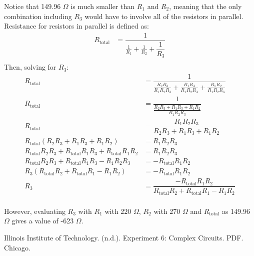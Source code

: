 \documentclass [12pt, letterpaper, twoside] {article}
\begin{document}
Notice that 149.96 \(\Omega\) is much smaller than \(R_{1}\) and \(R_{2}\), meaning that the only combination including \(R_{3}\) would have to involve all of the resistors in parallel. Resistance for resistors in parallel is defined as:
\begin{equation}
  \begin{split}
    R_{\text{total}} &= \dfrac{1}{\tfrac{1}{R_{1}} + \tfrac{1}{R_{2}} + \dfrac{1}{R_{3}}} \\
  \end{split}
\end{equation}
Then, solving for \(R_{3}\):
\begin{equation*}
  \begin{split}
    R_{\text{total}} &= \dfrac{1}{\tfrac{R_{2}R_{3}}{R_{1}R_{2}R_{3}} + \tfrac{R_{1}R_{3}}{R_{1}R_{2}R_{3}} + \tfrac{R_{1}R_{2}}{R_{1}R_{2}R_{3}}} \\
    R_{\text{total}} &= \dfrac{1}{\tfrac{R_{2}R_{3} + R_{1}R_{3} + R_{1}R_{2}}{R_{1}R_{2}R_{3}}} \\
    R_{\text{total}} &= \dfrac{R_{1}R_{2}R_{3}}{R_{2}R_{3} + R_{1}R_{3} + R_{1}R_{2}} \\
    R_{\text{total}}(R_{2}R_{3} + R_{1}R_{3} + R_{1}R_{2}) &= R_{1}R_{2}R_{3} \\
    R_{\text{total}}R_{2}R_{3} + R_{\text{total}}R_{1}R_{3} + R_{\text{total}}R_{1}R_{2} &= R_{1}R_{2}R_{3} \\
    R_{\text{total}}R_{2}R_{3} + R_{\text{total}}R_{1}R_{3} - R_{1}R_{2}R_{3} &= -R_{\text{total}}R_{1}R_{2} \\
    R_{3}(R_{\text{total}}R_{2} + R_{\text{total}}R_{1} - R_{1}R_{2}) &= -R_{\text{total}}R_{1}R_{2} \\
    R_{3} &= \dfrac{-R_{\text{total}}R_{1}R_{2}}{R_{\text{total}}R_{2} + R_{\text{total}}R_{1} -R_{1}R_{2}} \\
  \end{split}
\end{equation*}

However, evaluating \(R_{3}\) with \(R_{1}\) with 220 \(\Omega\), \(R_{2}\) with 270 \(\Omega\) and \(R_{\text{total}}\) as 149.96 \(\Omega\) gives a value of -623 \(\Omega\).

  Illinois Institute of Technology. (n.d.). Experiment 6: Complex Circuits. PDF. Chicago.
\end{document}
